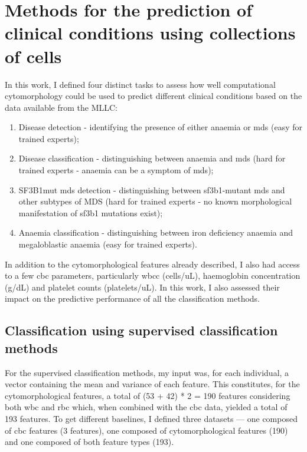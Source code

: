 \section{Methods for the prediction of clinical conditions using collections of cells}

In this work, I defined four distinct tasks to assess how well computational cytomorphology could be used to predict different clinical conditions based on the data available from the MLLC:

\begin{enumerate}
    \item Disease detection - identifying the presence of either anaemia or \ac{mds} (easy for trained experts);
    \item Disease classification - distinguishing between anaemia and \ac{mds} (hard for trained experts - anaemia can be a symptom of \ac{mds});
    \item SF3B1mut \ac{mds} detection - distinguishing between \ac{sf3b1}-mutant \ac{mds} and other subtypes of MDS (hard for trained experts - no known morphological manifestation of \ac{sf3b1} mutations exist);
    \item Anaemia classification - distinguishing between iron deficiency anaemia and megaloblastic anaemia (easy for trained experts).
\end{enumerate}

In addition to the cytomorphological features already described, I also had access to a few \ac{cbc} parameters, particularly \ac{wbcc} (cells/uL), haemoglobin concentration (g/dL) and platelet counts (platelets/uL). In this work, I also assessed their impact on the predictive performance of all the classification methods.

\subsection{Classification using supervised classification methods}

For the supervised classification methods, my input was, for each individual, a vector containing the mean and variance of each feature. This constitutes, for the cytomorphological features, a total of (53 + 42) * 2 = 190 features considering both \ac{wbc} and \ac{rbc} which, when combined with the \ac{cbc} data, yielded a total of 193 features. To get different baselines, I defined three datasets --- one composed of \ac{cbc} features (3 features), one composed of cytomorphological features (190) and one composed of both feature types (193). 

